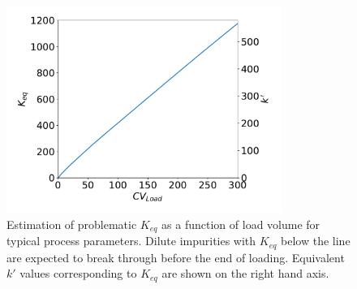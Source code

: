 \documentclass[11pt,a4paper]{article}
\begin{document}
\begin{figure}[bp]
    \centering
    \includegraphics[width=0.8\textwidth]{figure_4}
    \caption{Estimation of problematic $K_{eq}$ as a function of load volume for typical process parameters. Dilute impurities with $K_{eq}$ below the line are expected to break through before the end of loading. Equivalent $k'$ values corresponding to $K_{eq}$ are shown on the right hand axis.}
    \label{fig:problematic Keq}
\end{figure}
\end{document}
